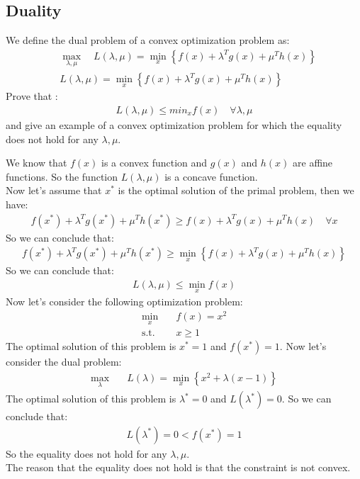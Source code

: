 \documentclass[12pt]{article}
\begin{document}
\subsection{Duality}
We define the dual problem of a convex optimization problem as:
\begin{align*}
     & \max_{\lambda, \mu} \quad  L(\lambda, \mu) = \min_{x} \left\{ f(x) + \lambda^T g(x) + \mu^T h(x) \right\} \\
     & L(\lambda, \mu)      = \min_{x} \left\{ f(x) + \lambda^T g(x) + \mu^T h(x) \right\}
\end{align*}
Prove that :
\begin{align*}
    L(\lambda, \mu) \leq min_{x} f(x) \quad \forall \lambda, \mu
\end{align*}
and give an example of a convex optimization problem for which the equality does not hold for any $\lambda, \mu$.\\
\begin{qsolve}[solution]
    We know that $f(x)$ is a convex function and $g(x)$ and $h(x)$ are affine functions. So the function $L(\lambda, \mu)$ is a concave function.\\
    Now let's assume that $x^*$ is the optimal solution of the primal problem, then we have:
    \begin{align*}
        f(x^*) + \lambda^T g(x^*) + \mu^T h(x^*) \geq f(x) + \lambda^T g(x) + \mu^T h(x) \quad \forall x
    \end{align*}
    So we can conclude that:
    \begin{align*}
        f(x^*) + \lambda^T g(x^*) + \mu^T h(x^*) \geq \min_{x} \left\{ f(x) + \lambda^T g(x) + \mu^T h(x) \right\}
    \end{align*}
    So we can conclude that:
    \begin{align*}
        L(\lambda, \mu) \leq \min_{x} f(x)
    \end{align*}
    Now let's consider the following optimization problem:
    \begin{align*}
        \min_{x} \quad    & f(x) = x^2 \\
        \text{s.t.} \quad & x \geq 1
    \end{align*}
    The optimal solution of this problem is $x^* = 1$ and $f(x^*) = 1$. Now let's consider the dual problem:
    \begin{align*}
        \max_{\lambda} \quad & L(\lambda) = \min_{x} \left\{ x^2 + \lambda(x-1) \right\}
    \end{align*}
    \splitqsolve
    The optimal solution of this problem is $\lambda^* = 0$ and $L(\lambda^*) = 0$. So we can conclude that:
    \begin{align*}
        L(\lambda^*) = 0 < f(x^*) = 1
    \end{align*}
    So the equality does not hold for any $\lambda, \mu$.\\
    The reason that the equality does not hold is that the constraint is not convex.
\end{qsolve}
\end{document}
